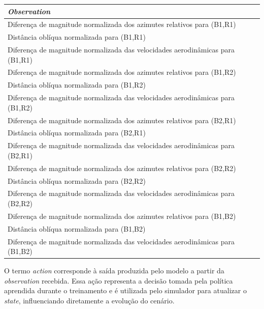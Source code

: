 \begin{table}[h!]
    \centering
    \begin{tabular}{|l|}
        \hline
        \textbf{\emph{Observation}} \\
        \hline
        Diferença de magnitude normalizada dos azimutes relativos para (B1,R1) \\
        \hline
        Distância oblíqua normalizada para (B1,R1) \\
        \hline
        Diferença de magnitude normalizada das velocidades aerodinâmicas para (B1,R1) \\
        \hline
        Diferença de magnitude normalizada dos azimutes relativos para (B1,R2) \\
        \hline
        Distância oblíqua normalizada para (B1,R2) \\
        \hline
        Diferença de magnitude normalizada das velocidades aerodinâmicas para (B1,R2) \\
        \hline
        Diferença de magnitude normalizada dos azimutes relativos para (B2,R1) \\
        \hline
        Distância oblíqua normalizada para (B2,R1) \\
        \hline
        Diferença de magnitude normalizada das velocidades aerodinâmicas para (B2,R1) \\
        \hline
        Diferença de magnitude normalizada dos azimutes relativos para (B2,R2) \\
        \hline
        Distância oblíqua normalizada para (B2,R2) \\
        \hline
        Diferença de magnitude normalizada das velocidades aerodinâmicas para (B2,R2) \\
        \hline
        Diferença de magnitude normalizada dos azimutes relativos para (B1,B2) \\
        \hline
        Distância oblíqua normalizada para (B1,B2) \\
        \hline
        Diferença de magnitude normalizada das velocidades aerodinâmicas para (B1,B2) \\
        \hline
    \end{tabular}
\end{table}

O termo \textit{action} corresponde à saída produzida pelo modelo a partir da \textit{observation} recebida. Essa ação representa a decisão tomada pela política aprendida durante o treinamento e é utilizada pelo simulador para atualizar o \textit{state}, influenciando diretamente a evolução do cenário.

